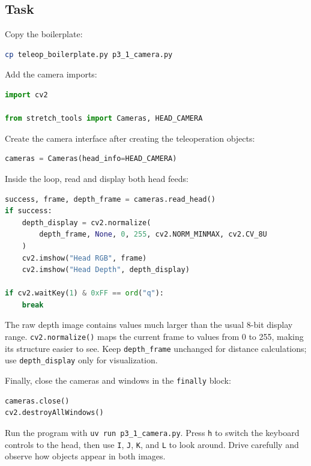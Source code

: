 \documentclass[11pt,a4paper]{article}
\begin{document}
\subsection*{Task}

Copy the boilerplate:

\begin{lstlisting}[language=bash]
cp teleop_boilerplate.py p3_1_camera.py
\end{lstlisting}

Add the camera imports:

\begin{lstlisting}[language=Python]
import cv2

from stretch_tools import Cameras, HEAD_CAMERA
\end{lstlisting}

Create the camera interface after creating the teleoperation objects:

\begin{lstlisting}[language=Python]
cameras = Cameras(head_info=HEAD_CAMERA)
\end{lstlisting}

Inside the loop, read and display both head feeds:

\begin{lstlisting}[language=Python]
success, frame, depth_frame = cameras.read_head()
if success:
    depth_display = cv2.normalize(
        depth_frame, None, 0, 255, cv2.NORM_MINMAX, cv2.CV_8U
    )
    cv2.imshow("Head RGB", frame)
    cv2.imshow("Head Depth", depth_display)

if cv2.waitKey(1) & 0xFF == ord("q"):
    break
\end{lstlisting}

The raw depth image contains values much larger than the usual 8-bit display
range. \texttt{cv2.normalize()} maps the current frame to values from 0 to 255,
making its structure easier to see. Keep \texttt{depth\_frame} unchanged for
distance calculations; use \texttt{depth\_display} only for visualization.

Finally, close the cameras and windows in the \texttt{finally} block:

\begin{lstlisting}[language=Python]
cameras.close()
cv2.destroyAllWindows()
\end{lstlisting}

Run the program with \texttt{uv run p3\_1\_camera.py}. Press \texttt{h} to
switch the keyboard controls to the head, then use \texttt{I}, \texttt{J},
\texttt{K}, and \texttt{L} to look around. Drive carefully and observe how
objects appear in both images.
\end{document}
